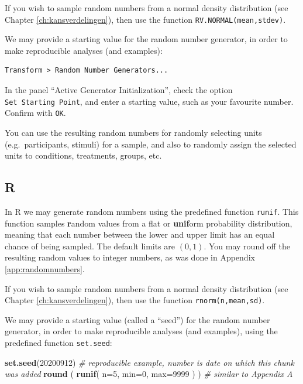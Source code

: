 \documentclass[
]{book}
\newenvironment{Shaded}{\begin{snugshade}}{\end{snugshade}}
\newcommand{\CommentTok}[1]{\textcolor[rgb]{0.56,0.35,0.01}{\textit{#1}}}
\newcommand{\DataTypeTok}[1]{\textcolor[rgb]{0.13,0.29,0.53}{#1}}
\newcommand{\DecValTok}[1]{\textcolor[rgb]{0.00,0.00,0.81}{#1}}
\newcommand{\KeywordTok}[1]{\textcolor[rgb]{0.13,0.29,0.53}{\textbf{#1}}}
\newcommand{\NormalTok}[1]{#1}
\begin{document}
If you wish to sample random numbers from a normal density distribution (see Chapter \ref{ch:kansverdelingen}), then use the function \texttt{RV.NORMAL(mean,stdev)}.

We may provide a starting value for the random number generator, in order to make reproducible analyses (and examples):

\begin{verbatim}
Transform > Random Number Generators...
\end{verbatim}

In the panel ``Active Generator Initialization'', check the option \texttt{Set\ Starting\ Point}, and enter a starting value, such as your favourite number. Confirm with \texttt{OK}.

You can use the resulting random numbers for randomly selecting units (e.g.~participants, stimuli) for a sample, and also to randomly assign the selected units to conditions, treatments, groups, etc.

\hypertarget{r}{%
\subsection{R}\label{r}}

In R we may generate random numbers using the predefined function \texttt{runif}.
This function samples \textbf{r}andom values from a flat or \textbf{unif}orm probability distribution, meaning that each number between the lower and upper limit has an equal chance of being sampled. The default limits are \((0,1)\). You may round off the resulting random values to integer numbers, as was done in Appendix \ref{app:randomnumbers}.

If you wish to sample random numbers from a normal density distribution (see Chapter \ref{ch:kansverdelingen}), then use the function \texttt{rnorm(n,mean,sd)}.

We may provide a starting value (called a ``seed'') for the random number generator, in order to make reproducible analyses (and examples), using the predefined function \texttt{set.seed}:

\begin{Shaded}
\begin{Highlighting}[]
\KeywordTok{set.seed}\NormalTok{(}\DecValTok{20200912}\NormalTok{) }\CommentTok{\# reproducible example, number is date on which this chunk was added}
\KeywordTok{round}\NormalTok{ ( }\KeywordTok{runif}\NormalTok{( }\DataTypeTok{n=}\DecValTok{5}\NormalTok{, }\DataTypeTok{min=}\DecValTok{0}\NormalTok{, }\DataTypeTok{max=}\DecValTok{9999}\NormalTok{ ) ) }\CommentTok{\# similar to Appendix A}
\end{Highlighting}
\end{Shaded}
\end{document}

